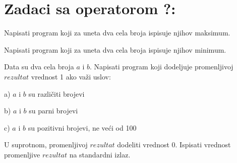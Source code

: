 \section{Zadaci sa operatorom ?:}


\begin{Exercise}[label=p1_17]
Napisati program koji za uneta dva cela broja ispisuje njihov maksimum. \\
\end{Exercise}
\begin{Answer}[ref=p1_17]
\end{Answer}

\begin{Exercise}[label=p1_17]
Napisati program koji za uneta dva cela broja ispisuje njihov minimum. \\
\end{Exercise}
\begin{Answer}[ref=p1_17]
\end{Answer}


\begin{Exercise}[label=p1_18]
Data su dva cela broja $a$ i $b$. Napisati program koji dodeljuje promenljivoj $rezultat$ vrednost 1
ako važi uslov:
\begin{description}
\item{a)} $a$ i $b$ su različiti brojevi
\item{b)} $a$ i $b$ su parni brojevi
\item{c)} $a$ i $b$ su pozitivni brojevi, ne veći od 100
\end{description} 
U suprotnom, promenljivoj $rezultat$ dodeliti vrednost 0. Ispisati vrednost promenljive $rezultat$ na standardni izlaz. \\


\end{Exercise}
\begin{Answer}[ref=p1_18]
\end{Answer}






